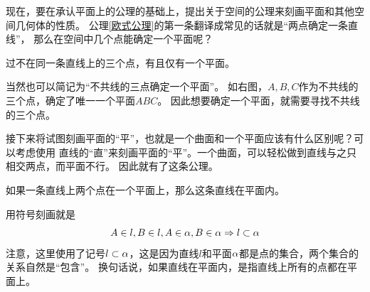 \begin{figure}[htbp]
    \centering
    \hspace{1cm}
    \hspace{1cm}
\end{figure}


现在，要在承认平面上的公理的基础上，提出关于空间的公理来刻画平面和其他空间几何体的性质。
公理\ref{欧式公理}的第一条翻译成常见的话就是“两点确定一条直线”，
那么在空间中几个点能确定一个平面呢？
\begin{axiom}\label{基本事实1}
    过不在同一条直线上的三个点，有且仅有一个平面。
\end{axiom}

当然也可以简记为“不共线的三点确定一个平面”。
如右图，\(A,B,C\)作为不共线的三个点，确定了唯一一个平面\(ABC\)。
因此想要确定一个平面，就需要寻找不共线的三个点。

接下来将试图刻画平面的“平”，也就是一个曲面和一个平面应该有什么区别呢？可以考虑使用
直线的“直”来刻画平面的“平”。一个曲面，可以轻松做到直线与之只相交两点，而平面不行。
因此就有了这条公理。
\begin{axiom}
    如果一条直线上两个点在一个平面上，那么这条直线在平面内。
\end{axiom}
用符号刻画就是
\[A\in l,B\in l,A\in \aa,B\in\aa \Rightarrow l\subset \aa\]
注意，这里使用了记号\(l\subset \aa\)，这是因为直线\(l\)和平面\(\aa\)都是点的集合，两个集合的关系自然是“包含”。
换句话说，如果直线在平面内，是指直线上所有的点都在平面上。

